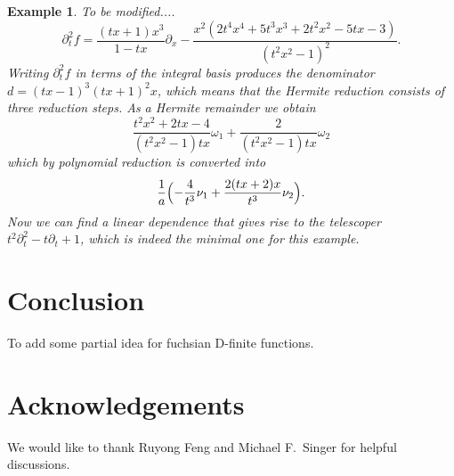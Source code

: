\documentclass{sig-alternate}
\newtheorem{example}[theorem]{Example}
\newcommand{\red}{\color{red}}
\begin{document}
\begin{example} { \red To be modified.... }
\[
  \partial_t^2f =
  \frac{(tx+1)x^3}{1-tx} \partial_x -
  \frac{x^2(2t^4x^4+5t^3x^3+2t^2x^2-5tx-3)}{(t^2x^2-1)^2}.
\]
Writing $\partial_t^2f$ in terms of the integral basis produces the denominator
$d=(tx-1)^3(tx+1)^2x$, which means that the Hermite reduction consists of three
reduction steps. As a Hermite remainder we obtain
\[
  \frac{t^2x^2+2tx-4}{(t^2x^2-1)tx} \omega_1 + \frac{2}{(t^2x^2-1)tx} \omega_2
\]
which by polynomial reduction is converted into
\[
  \frac1a \Bigl( -\frac{4}{t^3} \nu_1 + \frac{2(tx+2)x}{t^3} \nu_2 \Bigr).
\]
Now we can find a linear dependence that gives rise to the telescoper
$t^2\partial_t^2-t\partial_t+1$, which is indeed the minimal one for this example.
\end{example}

\section{Conclusion}

{\red To add some partial idea for fuchsian D-finite functions.}

\section*{Acknowledgements}

We would like to thank Ruyong Feng and Michael F.\ Singer for helpful discussions.



\end{document}
